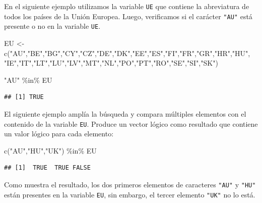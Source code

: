 \documentclass[
]{book}
\newenvironment{Shaded}{\begin{snugshade}}{\end{snugshade}}
\newcommand{\FunctionTok}[1]{\textcolor[rgb]{0.00,0.00,0.00}{#1}}
\newcommand{\NormalTok}[1]{#1}
\newcommand{\OtherTok}[1]{\textcolor[rgb]{0.56,0.35,0.01}{#1}}
\newcommand{\SpecialCharTok}[1]{\textcolor[rgb]{0.00,0.00,0.00}{#1}}
\newcommand{\StringTok}[1]{\textcolor[rgb]{0.31,0.60,0.02}{#1}}
\begin{document}
En el siguiente ejemplo utilizamos la variable \texttt{UE} que contiene la abreviatura de todos los países de la Unión Europea. Luego, verificamos si el carácter \texttt{"AU"} está presente o no en la variable \texttt{UE}.

\begin{Shaded}
\begin{Highlighting}[]
\NormalTok{EU }\OtherTok{\textless{}{-}} \FunctionTok{c}\NormalTok{(}\StringTok{"AU"}\NormalTok{,}\StringTok{"BE"}\NormalTok{,}\StringTok{"BG"}\NormalTok{,}\StringTok{"CY"}\NormalTok{,}\StringTok{"CZ"}\NormalTok{,}\StringTok{"DE"}\NormalTok{,}\StringTok{"DK"}\NormalTok{,}\StringTok{"EE"}\NormalTok{,}\StringTok{"ES"}\NormalTok{,}\StringTok{"FI"}\NormalTok{,}\StringTok{"FR"}\NormalTok{,}\StringTok{"GR"}\NormalTok{,}\StringTok{"HR"}\NormalTok{,}\StringTok{"HU"}\NormalTok{,}
        \StringTok{"IE"}\NormalTok{,}\StringTok{"IT"}\NormalTok{,}\StringTok{"LT"}\NormalTok{,}\StringTok{"LU"}\NormalTok{,}\StringTok{"LV"}\NormalTok{,}\StringTok{"MT"}\NormalTok{,}\StringTok{"NL"}\NormalTok{,}\StringTok{"PO"}\NormalTok{,}\StringTok{"PT"}\NormalTok{,}\StringTok{"RO"}\NormalTok{,}\StringTok{"SE"}\NormalTok{,}\StringTok{"SI"}\NormalTok{,}\StringTok{"SK"}\NormalTok{)}

\StringTok{"AU"} \SpecialCharTok{\%in\%}\NormalTok{ EU}
\end{Highlighting}
\end{Shaded}

\begin{verbatim}
## [1] TRUE
\end{verbatim}

El siguiente ejemplo amplía la búsqueda y compara múltiples elementos con el contenido de la variable \texttt{EU}. Produce un vector lógico como resultado que contiene un valor lógico para cada elemento:

\begin{Shaded}
\begin{Highlighting}[]
\FunctionTok{c}\NormalTok{(}\StringTok{"AU"}\NormalTok{,}\StringTok{"HU"}\NormalTok{,}\StringTok{"UK"}\NormalTok{) }\SpecialCharTok{\%in\%}\NormalTok{ EU}
\end{Highlighting}
\end{Shaded}

\begin{verbatim}
## [1]  TRUE  TRUE FALSE
\end{verbatim}

Como muestra el resultado, los dos primeros elementos de caracteres \texttt{"AU"} y \texttt{"HU"} están presentes en la variable \texttt{EU}, sin embargo, el tercer elemento \texttt{"UK"} no lo está.
\end{document}
